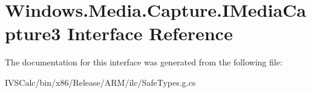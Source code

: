 \hypertarget{interface_windows_1_1_media_1_1_capture_1_1_i_media_capture3}{}\section{Windows.\+Media.\+Capture.\+I\+Media\+Capture3 Interface Reference}
\label{interface_windows_1_1_media_1_1_capture_1_1_i_media_capture3}


The documentation for this interface was generated from the following file\+:\begin{DoxyCompactItemize}
\item 
I\+V\+S\+Calc/bin/x86/\+Release/\+A\+R\+M/ilc/Safe\+Types.\+g.\+cs\end{DoxyCompactItemize}
